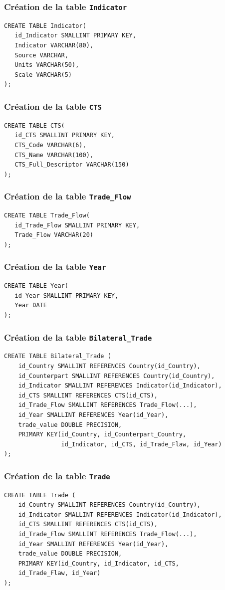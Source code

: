 \documentclass[11pt]{beamer}
\begin{document}
\begin{frame}[fragile]
  \frametitle{Création de la table \texttt{Indicator}}
\begin{verbatim}
CREATE TABLE Indicator(
   id_Indicator SMALLINT PRIMARY KEY,
   Indicator VARCHAR(80),
   Source VARCHAR,
   Units VARCHAR(50),
   Scale VARCHAR(5)
);
\end{verbatim}
\end{frame}

\begin{frame}[fragile]
  \frametitle{Création de la table \texttt{CTS}}
\begin{verbatim}
CREATE TABLE CTS(
   id_CTS SMALLINT PRIMARY KEY,
   CTS_Code VARCHAR(6),
   CTS_Name VARCHAR(100),
   CTS_Full_Descriptor VARCHAR(150)
);
\end{verbatim}
\end{frame}

\begin{frame}[fragile]
  \frametitle{Création de la table \texttt{Trade\_Flow}}
\begin{verbatim}
CREATE TABLE Trade_Flow(
   id_Trade_Flow SMALLINT PRIMARY KEY,
   Trade_Flow VARCHAR(20)
);
\end{verbatim}
\end{frame}

\begin{frame}[fragile]
  \frametitle{Création de la table \texttt{Year}}
\begin{verbatim}
CREATE TABLE Year(
   id_Year SMALLINT PRIMARY KEY,
   Year DATE
);
\end{verbatim}
\end{frame}

\begin{frame}[fragile]
  \frametitle{Création de la table \texttt{Bilateral\_Trade}}
\begin{verbatim}
CREATE TABLE Bilateral_Trade (
    id_Country SMALLINT REFERENCES Country(id_Country),
    id_Counterpart SMALLINT REFERENCES Country(id_Country),
    id_Indicator SMALLINT REFERENCES Indicator(id_Indicator),
    id_CTS SMALLINT REFERENCES CTS(id_CTS),
    id_Trade_Flow SMALLINT REFERENCES Trade_Flow(...),
    id_Year SMALLINT REFERENCES Year(id_Year),
    trade_value DOUBLE PRECISION,
    PRIMARY KEY(id_Country, id_Counterpart_Country,
                id_Indicator, id_CTS, id_Trade_Flaw, id_Year)
);
\end{verbatim}
\end{frame}

\begin{frame}[fragile]
  \frametitle{Création de la table \texttt{Trade}}
\begin{verbatim}
CREATE TABLE Trade (
    id_Country SMALLINT REFERENCES Country(id_Country),
    id_Indicator SMALLINT REFERENCES Indicator(id_Indicator),
    id_CTS SMALLINT REFERENCES CTS(id_CTS),
    id_Trade_Flow SMALLINT REFERENCES Trade_Flow(...),
    id_Year SMALLINT REFERENCES Year(id_Year),
    trade_value DOUBLE PRECISION,
    PRIMARY KEY(id_Country, id_Indicator, id_CTS, 
    id_Trade_Flaw, id_Year)
);
\end{verbatim}
\end{frame}
\end{document}

